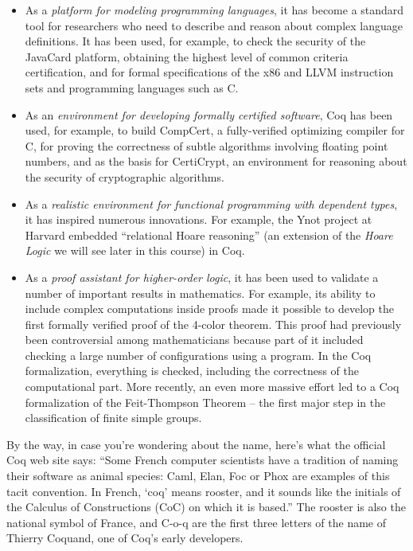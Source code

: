 \begin{itemize}
\item
  As a \emph{platform for modeling programming languages}, it has become
  a standard tool for researchers who need to describe and reason about
  complex language definitions. It has been used, for example, to check
  the security of the JavaCard platform, obtaining the highest level of
  common criteria certification, and for formal specifications of the
  x86 and LLVM instruction sets and programming languages such as C.
\item
  As an \emph{environment for developing formally certified software},
  Coq has been used, for example, to build CompCert, a fully-verified
  optimizing compiler for C, for proving the correctness of subtle
  algorithms involving floating point numbers, and as the basis for
  CertiCrypt, an environment for reasoning about the security of
  cryptographic algorithms.
\item
  As a \emph{realistic environment for functional programming with
  dependent types}, it has inspired numerous innovations. For example,
  the Ynot project at Harvard embedded ``relational Hoare reasoning''
  (an extension of the \emph{Hoare Logic} we will see later in this
  course) in Coq.
\item
  As a \emph{proof assistant for higher-order logic}, it has been used
  to validate a number of important results in mathematics. For example,
  its ability to include complex computations inside proofs made it
  possible to develop the first formally verified proof of the 4-color
  theorem. This proof had previously been controversial among
  mathematicians because part of it included checking a large number of
  configurations using a program. In the Coq formalization, everything
  is checked, including the correctness of the computational part. More
  recently, an even more massive effort led to a Coq formalization of
  the Feit-Thompson Theorem -- the first major step in the
  classification of finite simple groups.
\end{itemize}

By the way, in case you're wondering about the name, here's what the
official Coq web site says: ``Some French computer scientists have a
tradition of naming their software as animal species: Caml, Elan, Foc or
Phox are examples of this tacit convention. In French, `coq' means
rooster, and it sounds like the initials of the Calculus of
Constructions (CoC) on which it is based.'' The rooster is also the
national symbol of France, and C-o-q are the first three letters of the
name of Thierry Coquand, one of Coq's early developers.

